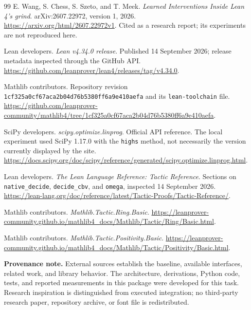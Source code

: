 \documentclass[11pt,a4paper]{article}
\begin{document}
\begin{thebibliography}{99}
E. Wang, S. Chess, S. Szeto, and T. Meek.
\emph{Learned Interventions Inside Lean 4's grind}.
arXiv:2607.22972, version 1, 2026.
\url{https://arxiv.org/html/2607.22972v1}.
Cited as a research report; its experiments are not reproduced here.

Lean developers. \emph{Lean v4.34.0 release}.
Published 14 September 2026; release metadata inspected through the GitHub API.
\url{https://github.com/leanprover/lean4/releases/tag/v4.34.0}.

Mathlib contributors. Repository revision
\texttt{1cf325a0cf67aca2b04d76b5380ff6a9e410aefa} and its
\texttt{lean-toolchain} file.
\url{https://github.com/leanprover-community/mathlib4/tree/1cf325a0cf67aca2b04d76b5380ff6a9e410aefa}.

SciPy developers. \emph{scipy.optimize.linprog}.
Official API reference. The local experiment used SciPy 1.17.0 with the
\texttt{highs} method, not necessarily the version currently displayed by the site.
\url{https://docs.scipy.org/doc/scipy/reference/generated/scipy.optimize.linprog.html}.

Lean developers. \emph{The Lean Language Reference: Tactic Reference}.
Sections on \texttt{native\_decide}, \texttt{decide\_cbv}, and \texttt{omega},
inspected 14 September 2026.
\url{https://lean-lang.org/doc/reference/latest/Tactic-Proofs/Tactic-Reference/}.

Mathlib contributors. \emph{Mathlib.Tactic.Ring.Basic}.
\url{https://leanprover-community.github.io/mathlib4_docs/Mathlib/Tactic/Ring/Basic.html}.

Mathlib contributors. \emph{Mathlib.Tactic.Positivity.Basic}.
\url{https://leanprover-community.github.io/mathlib4_docs/Mathlib/Tactic/Positivity/Basic.html}.
\end{thebibliography}

\medskip
\textbf{Provenance note.} External sources establish the baseline, available
interfaces, related work, and library behavior. The architecture, derivations,
Python code, tests, and reported measurements in this package were developed
for this task. Research inspiration is distinguished from executed integration;
no third-party research paper, repository archive, or font file is redistributed.

\end{document}
